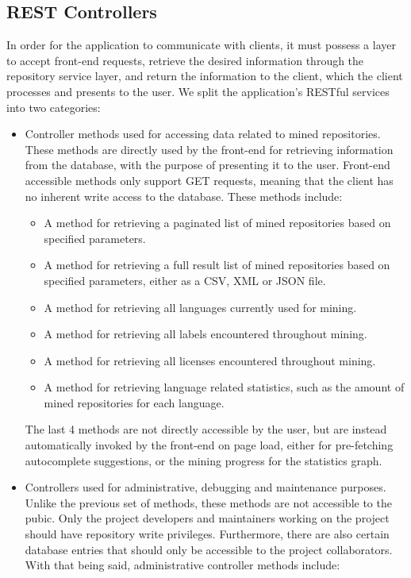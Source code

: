\newpage
\subsection{REST Controllers}

In order for the application to communicate with clients, it must possess a layer to accept front-end requests, retrieve the desired information through the repository service layer, and return the information to the client, which the client processes and presents to the user. We split the application's RESTful services into two categories:

\begin{itemize}
    \item Controller methods used for accessing data related to mined repositories.
    \\These methods are directly used by the front-end for retrieving information from the database, with the purpose of presenting it to the user. Front-end accessible methods only support GET requests, meaning that the client has no inherent write access to the database. These methods include:
    \begin{itemize}
        \item A method for retrieving a paginated list of mined repositories based on specified parameters.
        \item A method for retrieving a full result list of mined repositories based on specified parameters, either as a CSV, XML or JSON file.
        \item A method for retrieving all languages currently used for mining.
        \item A method for retrieving all labels encountered throughout mining.
        \item A method for retrieving all licenses encountered throughout mining.
        \item A method for retrieving language related statistics, such as the amount of mined repositories for each language.
    \end{itemize}
    The last 4 methods are not directly accessible by the user, but are instead automatically invoked by the front-end on page load, either for pre-fetching autocomplete suggestions, or the mining progress for the statistics graph.
    \item Controllers used for administrative, debugging and maintenance purposes.
    \\Unlike the previous set of methods, these methods are not accessible to the pubic. Only the project developers and maintainers working on the project should have repository write privileges. Furthermore, there are also certain database entries that should only be accessible to the project collaborators. With that being said, administrative controller methods include:

\end{itemize}
